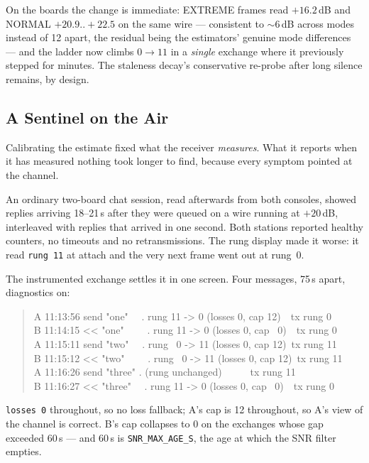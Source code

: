 On the boards the change is immediate: EXTREME frames read
$+16.2$\,dB and NORMAL $+20.9..{+}22.5$ on the same wire ---
consistent to $\sim$6\,dB across modes instead of 12 apart, the
residual being the estimators' genuine mode differences --- and the
ladder now climbs $0 \to 11$ in a \emph{single} exchange where it
previously stepped for minutes. The staleness decay's conservative
re-probe after long silence remains, by design.

\subsection{A Sentinel on the Air}
\label{sec:cport_sentinel}

Calibrating the estimate fixed what the receiver \emph{measures}.  What
it reports when it has measured nothing took longer to find, because
every symptom pointed at the channel.

An ordinary two-board chat session, read afterwards from both consoles,
showed replies arriving 18--21\,s after they were queued on a wire
running at $+20$\,dB, interleaved with replies that arrived in one
second.  Both stations reported healthy counters, no timeouts and no
retransmissions.  The rung display made it worse: it read \texttt{rung
11} at attach and the very next frame went out at rung~0.

The instrumented exchange settles it in one screen.  Four messages,
75\,s apart, diagnostics on:

\begin{quote}\ttfamily\small
A 11:13:56 send "one" \ \ . rung 11 -> 0 (losses 0, cap 12)\ \ tx rung 0\\
B 11:14:15 << "one" \ \ \ \ . rung 11 -> 0 (losses 0, cap \ 0)\ \ tx rung 0\\
A 11:15:11 send "two" \ \ . rung \ 0 -> 11 (losses 0, cap 12)\ tx rung 11\\
B 11:15:12 << "two" \ \ \ \ . rung \ 0 -> 11 (losses 0, cap 12)\ tx rung 11\\
A 11:16:26 send "three" . (rung unchanged) \ \ \ \ \ tx rung 11\\
B 11:16:27 << "three" \ \ . rung 11 -> 0 (losses 0, cap \ 0)\ \ tx rung 0
\end{quote}

\texttt{losses 0} throughout, so no loss fallback; A's cap is 12
throughout, so A's view of the channel is correct.  B's cap collapses
to 0 on the exchanges whose gap exceeded 60\,s --- and 60\,s is
\texttt{SNR\_MAX\_AGE\_S}, the age at which the SNR filter empties.

